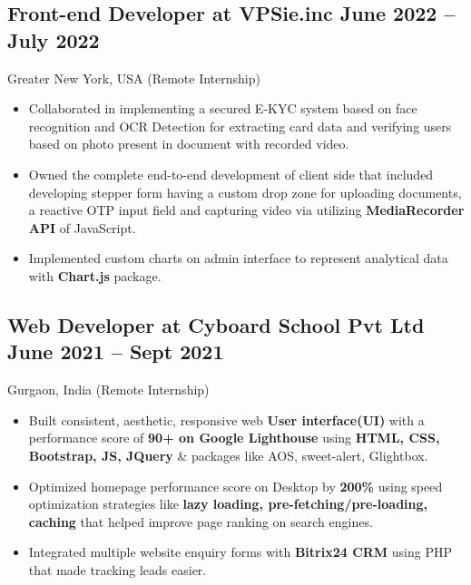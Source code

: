 \documentclass[a4,10pt]{article}
\newcommand{\subtext}[1]{
#1\par\vspace{-0.2cm}}
\newenvironment{zitemize}{
\begin{itemize}\itemsep0pt \parskip0pt \parsep1pt}
{\end{itemize}\vspace{-0.5cm}}
\begin{document}
\subsection*{Front-end Developer at VPSie.inc \hfill June 2022 -- July 2022} 
\subtext{Greater New York, USA {\normalsize\normalfont (Remote Internship) }} 
    \begin{zitemize}
        \item Collaborated in implementing a secured E-KYC system based on face recognition and OCR Detection for extracting card data and verifying users based on photo present in document with recorded video.
        \item Owned the complete end-to-end development of client side that included developing stepper form having a custom drop zone for uploading documents, a reactive OTP input field and capturing video via utilizing \textbf{MediaRecorder API} of JavaScript.
        \item Implemented custom charts on admin interface to represent analytical data with \textbf{Chart.js} package.
    \end{zitemize}


\subsection*{Web Developer at Cyboard School Pvt Ltd \hfill June 2021 -- Sept 2021} 
\subtext{Gurgaon, India {\normalsize\normalfont (Remote Internship) }}
    \begin{zitemize}
        \item Built consistent, aesthetic, responsive web \textbf{User interface(UI)} with a performance score of \textbf{90+ on Google Lighthouse}
        using \textbf{HTML, CSS, Bootstrap, JS, JQuery} \& packages like AOS, sweet-alert, Glightbox. 
        \item Optimized homepage performance score on Desktop by \textbf{200\%} using speed optimization strategies like \textbf{lazy loading, pre-fetching/pre-loading, caching} that helped improve page ranking on search engines.
        \item Integrated multiple website enquiry forms with \textbf{Bitrix24 CRM} using PHP that made tracking leads easier.
    \end{zitemize}
\end{document}
